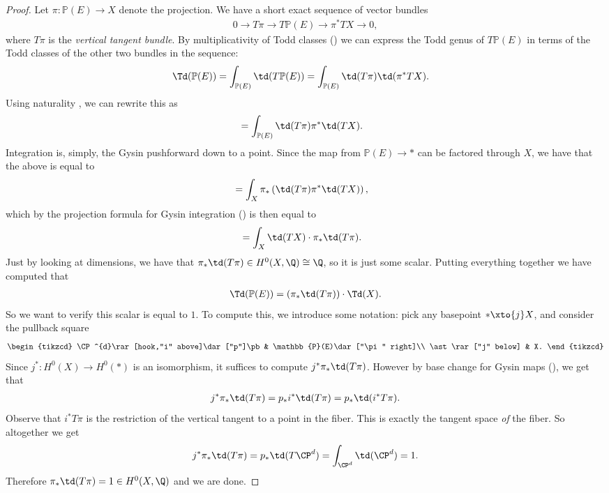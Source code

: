 \documentclass[11pt]{book}
\begin{document}
\begin{proof} Let $\pi \colon \mathbb{P}(E) \to X$ denote the projection. We have a short exact sequence of vector bundles
\begin{align*}
    0 \to T\pi \to T \mathbb{P}(E) \to \pi^\ast TX \to 0,
\end{align*}
where $T\pi$ is the \emph{vertical tangent bundle}. By multiplicativity of Todd classes () we can express the Todd genus of $T \mathbb{P}(E)$ in terms of the Todd classes of the other two bundles in the sequence:
\begin{align*}
    \Td(\mathbb{P}(E)) &= \int_{\mathbb{P}(E)} \td(T \mathbb{P}(E)) = \int_{\mathbb{P}(E)} \td(T\pi) \td(\pi^\ast TX).
\end{align*}
Using naturality , we can rewrite this as
\begin{align*}
    &= \int_{\mathbb{P}(E)} \td(T\pi) \pi^\ast \td(TX).
\end{align*}
Integration is, simply, the Gysin pushforward down to a point. Since the map from $\mathbb{P}(E) \to \ast$ can be factored through $X$, we have that the above is equal to
\begin{align*}
    &=\int_X \pi_\ast \left( \td(T\pi) \pi^\ast \td(TX) \right),
\end{align*}
which by the projection formula for Gysin integration () is then equal to
\begin{align*}
    &= \int_X  \td(TX) \cdot \pi_\ast \td(T\pi).
\end{align*}
Just by looking at dimensions, we have that $\pi_\ast \td(T\pi) \in H^0(X,\Q) \cong \Q$, so it is just some scalar. Putting everything together we have computed that
\begin{align*}
    \Td(\mathbb{P}(E)) = (\pi_\ast \td(T\pi))\cdot \Td(X).
\end{align*}
So we want to verify this scalar is equal to $1$. To compute this, we introduce some notation: pick any basepoint $\ast \xto{j} X$, and consider the pullback square
\[ \begin{tikzcd}
    \CP^{d}\rar[hook,"i" above]\dar["p"]\pb & \mathbb{P}(E)\dar["\pi" right]\\
    \ast\rar["j" below] & X.
\end{tikzcd} \]
Since $j^\ast \colon H^0(X) \to H^0(\ast)$ is an isomorphism, it suffices to compute $j^\ast \pi_\ast \td(T\pi)$. However by base change for Gysin maps (), we get that
\begin{align*}
    j^\ast \pi_\ast \td(T\pi) = p_\ast i^\ast \td(T\pi) = p_\ast \td(i^\ast T\pi).
\end{align*}
Observe that $i^\ast T\pi$ is the restriction of the vertical tangent to a point in the fiber. This is exactly the tangent space \emph{of} the fiber. So altogether we get
\begin{align*}
    j^\ast \pi_\ast \td(T\pi) = p_\ast \td(T\CP^d) = \int_{\CP^d}\td(\CP^d) = 1.
\end{align*}
Therefore $\pi_\ast \td(T\pi) = 1 \in H^0(X,\Q)$ and we are done.
\end{proof}
\end{document}
